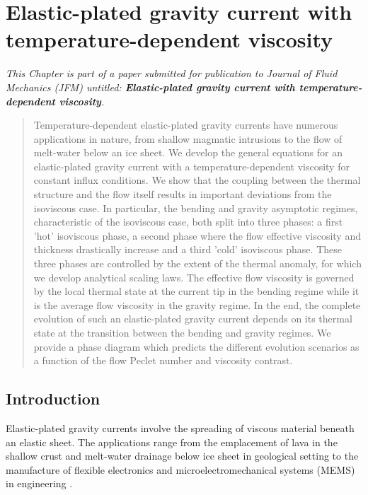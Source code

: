 \chapter[Cooling elastic-plated gravity current]{Elastic-plated gravity current with temperature-dependent
  viscosity}
\label{C3-JFM}

\textit{This Chapter is part of a paper submitted for publication to Journal of Fluid
  Mechanics  (JFM)  untitled: \textbf{Elastic-plated  gravity  current
    with temperature-dependent viscosity}.}


\minitoc

\begin{abstract}
  Temperature-dependent elastic-plated gravity  currents have numerous
  applications in nature, from shallow magmatic intrusions to the flow
  of melt-water below  an ice sheet. We develop  the general equations
  for an  elastic-plated gravity current with  a temperature-dependent
  viscosity for constant influx conditions.  We show that the coupling
  between  the  thermal  structure  and the  flow  itself  results  in
  important deviations  from the  isoviscous case. In  particular, the
  bending  and  gravity  asymptotic  regimes,  characteristic  of  the
  isoviscous  case,  both  split  into three  phases:  a  first  'hot'
  isoviscous phase, a second phase  where the flow effective viscosity
  and  thickness drastically  increase and  a third  'cold' isoviscous
  phase.   These three  phases are  controlled  by the  extent of  the
  thermal anomaly, for  which we develop analytical  scaling laws. The
  effective flow viscosity  is governed by the local  thermal state at
  the current tip  in the bending regime while it  is the average flow
  viscosity in the gravity regime.  In the end, the complete evolution
  of such  an elastic-plated  gravity current  depends on  its thermal
  state at the transition between  the bending and gravity regimes. We
  provide  a  phase diagram  which  predicts  the different  evolution
  scenarios  as a  function of  the flow  Peclet number  and viscosity
  contrast.

\end{abstract}


\section{Introduction}

Elastic-plated  gravity  currents  involve the  spreading  of  viscous
material beneath  an elastic  sheet. The  applications range  from the
emplacement      of      lava      in      the      shallow      crust
\citep{Michaut:2011kg,Bunger:2011cb} and melt-water drainage below ice
sheet  \citep{Das:2008in,Tsai:2010ev}  in  geological setting  to  the
manufacture of flexible electronics and microelectromechanical systems
(MEMS) in engineering \citep{Hosoi:2004dn}.

